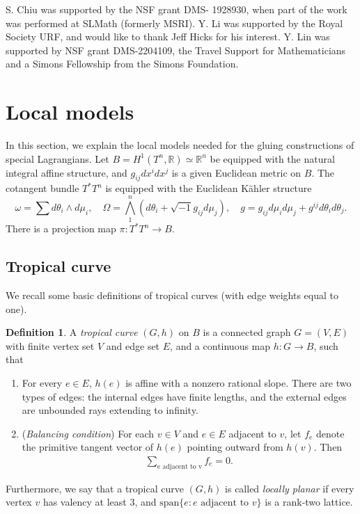 \documentclass{article}
\theoremstyle{definition}
\newtheorem{Def}[thm]{Definition}
\newcommand{\R}{\mathbb{R}}
\begin{document}
     S. Chiu was supported by the NSF grant DMS-
1928930, when part of the work was performed at SLMath (formerly MSRI). Y. Li was supported by the Royal Society URF, and would like to thank Jeff Hicks for his interest. Y. Lin was supported by NSF grant DMS-2204109, the Travel Support for Mathematicians and a Simons Fellowship from the Simons Foundation.
    
	
	
	\section{Local models} \label{sec: local models}
	
	
	
	In this section, we explain the local models needed for the gluing constructions of special Lagrangians. Let $B= H^1(T^n,\R)\simeq \R^n$  be equipped with the natural integral affine structure, and $ g_{ij} dx^i dx^j$ is a given Euclidean metric on $B$.  The cotangent bundle $T^*T^n$ is equipped with the Euclidean K\"ahler structure
	\[
	\omega=\sum d\theta_i\wedge d\mu_i, \quad \Omega= \bigwedge_1^n (d\theta_i+ \sqrt{-1} g_{ij} d\mu_j), \quad g=g_{ij} d\mu_id\mu_j+ g^{ij} d\theta_id\theta_j.
	\]
	There is a projection map $\pi: T^*T^n\to B$.
	
	
	\subsection{Tropical curve}
	
	
	We recall some basic definitions of tropical curves (with edge weights equal to one).
	
	
	
	
	
	
	\begin{Def}\label{Def:tropicalcurve}
		A \emph{tropical curve} $(G,h)$ on $B$ is a connected graph $G=(V,E)$ with finite vertex set $V$ and edge set $E$, and a continuous map $h:G\rightarrow B$, such that \begin{enumerate}
			\item For every $e\in E$, $h(e)$ is affine with a nonzero rational slope. There are two types of edges: the internal edges have finite lengths, and the external edges are unbounded rays extending to infinity.
			
			
			\item (\emph{Balancing condition}) For each $v\in V$ and $e\in E$ adjacent to $v$, let $f_e$ denote the primitive tangent vector of $h(e)$ pointing outward from $h(v)$. Then 
			\begin{align*}
				\sum_{\text{e adjacent to v}} f_e=0.
			\end{align*} 
		\end{enumerate}
		Furthermore, we say that a tropical curve $(G,h)$ is called \emph{locally planar} if every vertex $v$ has valency at least $3$, and $\text{span}\{e : e \mbox{ adjacent to }v\}$ is a rank-two lattice.               
	\end{Def} 
	
\end{document}
